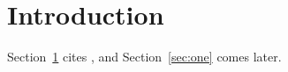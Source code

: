 \documentclass{article}
\begin{document}
\section{Introduction}\label{sec:intro}
Section~\ref{sec:intro} cites \cite{knuth}, and Section~\ref{sec:one} comes later.



\end{document}
